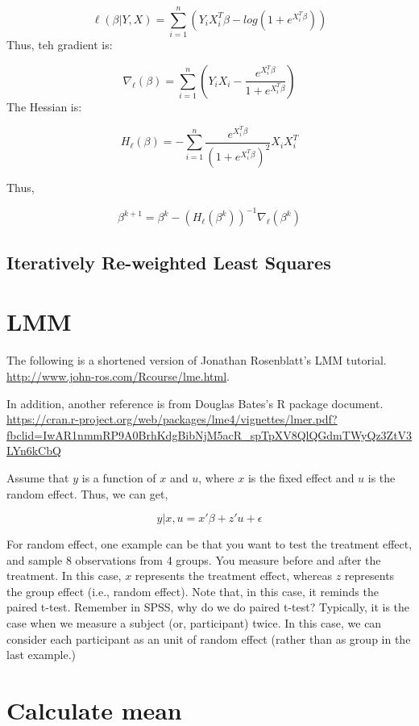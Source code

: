 \documentclass[]{book}
\begin{document}
\[\ell(\beta|Y,X)=\sum_{i=1}^{n}(Y_iX_i^{T}\beta-log(1+e^{X_i^T \beta}))\]
Thus, teh gradient is:

\[\nabla_{\ell}(\beta)=\sum_{i=1}^{n}(Y_iX_i - \frac{e^{X_i^T \beta}}{1+e^{X_i^T \beta}})\]
The Hessian is:

\[H_{\ell}(\beta)=-\sum_{i=1}^{n}\frac{e^{X_i^T \beta}}{(1+e^{X_i^T \beta})^2}X_iX_i^T\]

Thus,

\[\beta^{k+1}=\beta^k-(H_{\ell}(\beta^k))^{-1}\nabla_{\ell}(\beta^k) \]

\subsection{Iteratively Re-weighted Least
Squares}\label{iteratively-re-weighted-least-squares}

\section{LMM}\label{lmm}

The following is a shortened version of Jonathan Rosenblatt's LMM
tutorial. \url{http://www.john-ros.com/Rcourse/lme.html}.

In addition, another reference is from Douglas Bates's R package
document.
\url{https://cran.r-project.org/web/packages/lme4/vignettes/lmer.pdf?fbclid=IwAR1nmmRP9A0BrhKdgBibNjM5acR_spTpXV8QlQGdmTWyQz3ZtV3LYn6kCbQ}

Assume that \(y\) is a function of \(x\) and \(u\), where \(x\) is the
fixed effect and \(u\) is the random effect. Thus, we can get,

\[y|x, u = x'\beta+z'u+\epsilon\]

For random effect, one example can be that you want to test the
treatment effect, and sample 8 observations from 4 groups. You measure
before and after the treatment. In this case, \(x\) represents the
treatment effect, whereas \(z\) represents the group effect (i.e.,
random effect). Note that, in this case, it reminds the paired t-test.
Remember in SPSS, why do we do paired t-test? Typically, it is the case
when we measure a subject (or, participant) twice. In this case, we can
consider each participant as an unit of random effect (rather than as
group in the last example.)

\section{Calculate mean}\label{calculate-mean}
\end{document}
